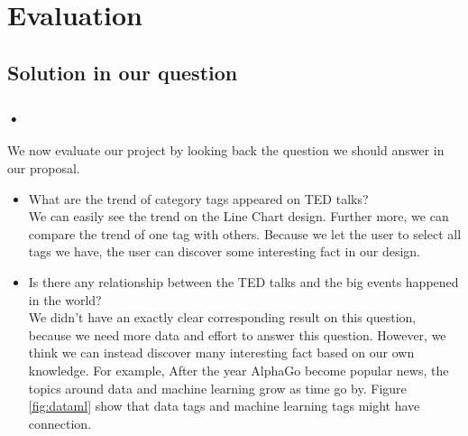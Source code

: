 \documentclass{report}
\numberwithin{figure}{section}
\begin{document}
\chapter{Evaluation}
\section{Solution in our question}

\subsection{•}

\quad We now evaluate our project by looking back the question we should answer in our proposal.
\begin{itemize}
\item
What are the trend of category tags appeared on TED talks?
\\
\quad We can easily see the trend on the Line Chart design. Further more, we can compare the trend of one tag with others. Because we let the user to select all tags we have, the user can discover some interesting fact in our design.

\item
Is there any relationship between the TED talks and the big events happened in the world? 
\\
\quad We didn't have an exactly clear corresponding result on this question, because we need more data and effort to answer this question. However, we think we can instead discover many interesting fact based on our own knowledge. For example, After the year AlphaGo become popular news, the topics around data and machine learning grow as time go by. Figure \ref{fig:dataml} show that data tags and machine learning tags might have connection.



\end{itemize}
\end{document}
